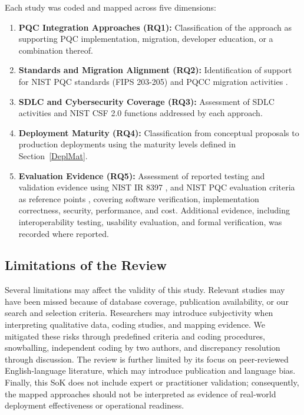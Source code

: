 \documentclass[letterpaper,twocolumn,10pt]{article}
\begin{document}
Each study was coded and mapped across five dimensions:

\begin{enumerate}
\item \textbf{PQC Integration Approaches (RQ1):} Classification of the approach as supporting PQC implementation, migration, developer education, or a combination thereof.
\item \textbf{Standards and Migration Alignment (RQ2):} Identification of support for NIST PQC standards (FIPS 203-205) \cite{nist_fips_203_2024,nist_fips_204_2024,nist_fips_205_2024} and PQCC migration activities \cite{pqcc_pqc_migration_roadmap_2025}.
\item \textbf{SDLC and Cybersecurity Coverage (RQ3):} Assessment of SDLC activities \cite{ibm_sdlc_2024} and NIST CSF 2.0 functions \cite{nist_cswp_29_2024} addressed by each approach.
\item \textbf{Deployment Maturity (RQ4):} Classification from conceptual proposals to production deployments using the maturity levels defined in Section~\ref{DeplMat}.
\item \textbf{Evaluation Evidence (RQ5):} Assessment of reported testing and validation evidence using NIST IR 8397 \cite{nist_ir_8397_2021}, and NIST PQC evaluation criteria as reference points \cite{nist_pqc_security_evaluation_criteria, nist_pqc_cost_evaluation_criteria}, covering software verification, implementation correctness, security, performance, and cost. Additional evidence, including interoperability testing, usability evaluation, and formal verification, was recorded where reported.
\end{enumerate}

\subsection{Limitations of the Review}
\label{ReviewLimit}

Several limitations may affect the validity of this study. Relevant studies may have been missed because of database coverage, publication availability, or our search and selection criteria. Researchers may introduce subjectivity when interpreting qualitative data, coding studies, and mapping evidence. We mitigated these risks through predefined criteria and coding procedures, snowballing, independent coding by two authors, and discrepancy resolution through discussion. The review is further limited by its focus on peer-reviewed English-language literature, which may introduce publication and language bias. Finally, this SoK does not include expert or practitioner validation; consequently, the mapped approaches should not be interpreted as evidence of real-world deployment effectiveness or operational readiness.
\end{document}
